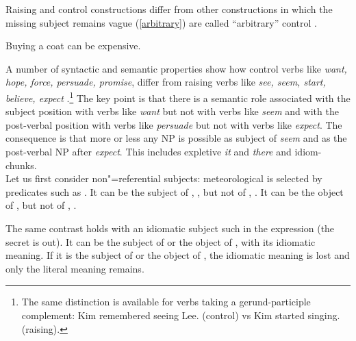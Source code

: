 \documentclass[output=paper
	        ,collection
	        ,collectionchapter
 	        ,biblatex
                ,babelshorthands
                ,newtxmath
                ,draftmode
                ,colorlinks, citecolor=brown
]{langscibook}
\begin{document}
 Raising and control constructions differ from other constructions in which the missing subject remains vague (\ref{arbitrary}) are called ``arbitrary'' control \citep{Bresnan1982}.\addpages
 
\begin{exe}
 \ex Buying a coat can be expensive.\label{arbitrary}
  \end{exe}
  
 A number of syntactic and semantic properties show how control verbs like \emph{want, hope, force, persuade, promise}, differ from raising verbs like \emph{see, seem, start, believe, expect} \citep{Rosenbaum67a-u,Postal1974,Bresnan1982}.\footnote{The same distinction is available for verbs taking a gerund-participle complement:
Kim remembered seeing Lee. (control) vs  Kim started singing. (raising).}
 The key point is that there is a semantic role associated with the subject position with verbs like \emph{want} but not with verbs like \emph{seem} and with the post-verbal position with verbs like \emph{persuade} but not with verbs like \emph{expect}.  The consequence is that more or less any NP is possible as subject of \emph{seem} and as the post-verbal NP after \emph{expect}. This includes expletive \emph{it} and \emph{there} and idiom-chunks. \\
 Let us first consider non"=referential subjects: meteorological  is selected
 by predicates such as . It can be the subject of , , but not of
 , . It can be the object of ,  but not of , .
	
\eal
{}
 \label{rain1}
 \label{rain2}
\zl
\eal
{} \label{rain3}
 \label{rain4}
\zl
 	
 The same contrast holds with an idiomatic subject such  in the expression  (the secret is out). It can be the subject of  or the object of , with its idiomatic meaning. If it is the subject of  or the object of , the idiomatic meaning is lost and only the literal meaning remains.
 
\eal
\judgewidth{\#}
 \label{cat1}
 \label{cat2}
 \label{cat3}
 \label{cat4}
\zl
\end{document}
